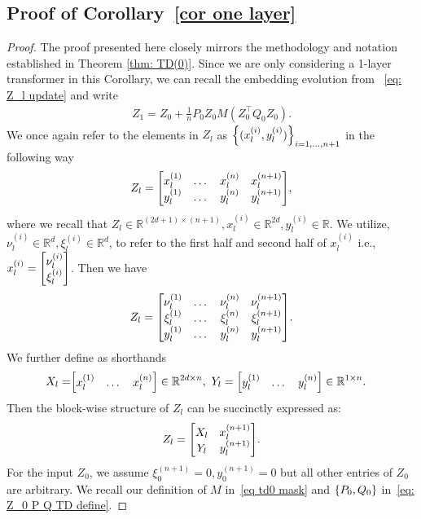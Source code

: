 \documentclass{article}
\newcommand{\R}{\mathbb{R}}
\begin{document}
\subsection{Proof of Corollary~\ref{cor one layer}} \label{appendix: proof cor one layer}
  \begin{proof}
    The proof presented here closely mirrors the methodology and notation established in Theorem \ref{thm: TD(0)}. Since we are only considering a 1-layer transformer in this Corollary, we can recall the embedding evolution from ~\eqref{eq: Z_l update} and write
    \begin{align}
        Z_{1} = Z_0 + \frac{1}{n} P_0 Z_0 M(Z_0^\top Q_0 Z_0).
    \end{align}
    We once again refer to the elements in $Z_l$ as $\qty{(x^{(i)}_l, y^{(i)}_l)}_{i=1,\dots, n+1}$ in the following way
    \begin{align}
        Z_l = \mqty[x_l^{(1)} & \dots & x_l^{(n)} & x_l^{(n+1)} \\ y_l^{(1)} & \dots & y_l^{(n)} & y_l^{(n+1)}],
    \end{align}
    where we recall that $Z_l \in \R^{(2d + 1) \times (n+1)}, x_l^{(i)} \in \R^{2d}, y^{(i)}_l \in \R$.
    We utilize, $\nu^{(i)}_l \in \R^d, \xi_l^{(i)} \in \R^d$, to refer to the first half and second half of $x_l^{(i)}$ i.e., $x_l^{(i)} = \mqty[\nu_l^{(i)} \\ \xi_l^{(i)}]$.
    Then we have
    \begin{align}
        Z_l = \mqty[\nu_l^{(1)} & \dots & \nu_l^{(n)} & \nu_l^{(n+1)} \\
        \xi_l^{(1)} & \dots & \xi_l^{(n)} & \xi_l^{(n+1)} \\
         y_l^{(1)} & \dots & y_l^{(n)} & y_l^{(n+1)}].
    \end{align}
    We further define as shorthands
    \begin{align}
        X_l =& \mqty[x_l^{(1)} & \dots & x_l^{(n)}] \in \R^{2d \times n}, \ Y_l =  \mqty[y_l^{(1)} & \dots & y_l^{(n)}] \in \R^{1 \times n}.
    \end{align}
    Then the block-wise structure of $Z_l$ can be succinctly expressed as:
    \begin{align}
        Z_l = \mqty[X_l & x_l^{(n+1)} \\ Y_l & y_l^{(n+1)}]. \label{eq: z_l blockwise X Y L1}
    \end{align}
    For the input $Z_0$,
    we assume $\xi_0^{(n+1)} = 0, y_0^{(n+1)} = 0$ but all other entries of $Z_0$ are arbitrary.
    We recall our definition of $M$ in~\eqref{eq td0 mask} and $\qty{P_0, Q_0}$ in~\eqref{eq: Z_0 P Q TD define}.

\end{proof}
\end{document}

